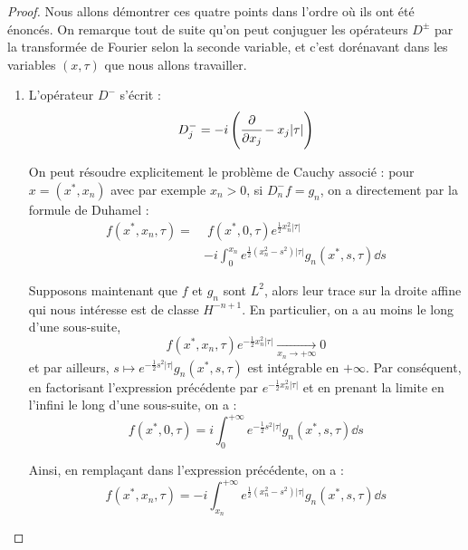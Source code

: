\begin{proof}
Nous allons démontrer ces quatre points dans l'ordre où ils ont été
énoncés. On remarque tout de suite qu'on peut conjuguer les opérateurs
$D^{\pm}$ par la transformée de Fourier selon la seconde variable, et
c'est dorénavant dans les variables $(x,\tau)$ que nous allons travailler.

\begin{enumerate}
  \item L'opérateur $D^-$ s'écrit :
  \begin{equation*}
    D^-_j = -i\left(\cfrac{\partial}{\partial x_j} - x_j |\tau|\right)
  \end{equation*}
  
  On peut résoudre explicitement le problème de Cauchy associé : pour $x=(x^*,x_n)$ avec par exemple $x_n > 0$, si $D^-_nf = g_n$, on a directement par la formule de Duhamel :
  \begin{equation*}
  \begin{split}
    f(x^*,x_n,\tau)  = &\;f(x^*,0,\tau)e^{\frac12 x_n^2 |\tau|} \\ &
    -i \int_0^{x_n}e^{\frac 12 (x_n^2 - s^2)|\tau|}g_n(x^*,s,\tau)\dd s
    \end{split}
  \end{equation*}
  
  Supposons maintenant que $f$ et $g_n$ sont $L^2$, alors leur trace sur la droite affine qui nous intéresse est de classe $H^{-n+1}$. En particulier, on a au moins le long d'une sous-suite, 
  \begin{equation*}
    f(x^*, x_n,\tau)e^{-\frac 12 x_n^2 |\tau|} \underset{x_n \to +\infty}{\longrightarrow} 0
  \end{equation*}
  \noindent et par ailleurs, $s \mapsto e^{-\frac 12 s^2 |\tau|}g_n(x^*,s,\tau)$ est intégrable en $+\infty$. Par conséquent, en factorisant l'expression précédente par $e^{-\frac 12 x_n^2 |\tau|}$ et en prenant la limite en l'infini le long d'une sous-suite, on a :
  \begin{equation*}
    f(x^*,0,\tau) = i \int_0^{+\infty}e^{-\frac 12
      s^2|\tau|}g_n(x^*,s,\tau)\dd s
  \end{equation*}
  
  Ainsi, en remplaçant dans l'expression précédente, on a :
  \begin{equation*}
    f(x^*,x_n,\tau)=  -i \int_{x_n}^{+\infty}e^{\frac 12 (x_n^2 -
      s^2)|\tau|}g_n(x^*,s,\tau)\dd s
  \end{equation*}
  

\end{enumerate}
\end{proof}
